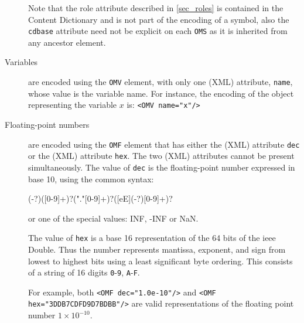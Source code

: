 \documentclass{report}
\def\XML{XML\xspace}
\def\acronym#1{\textsf{#1}}
\begin{document}
\begin{description}
Note that the role attribute described in \ref{sec_roles} is contained in the Content Dictionary and is not
part of the encoding of a symbol, also the \lstinline|cdbase| attribute need not
be explicit on each \lstinline|OMS| as it is inherited
from any ancestor element.
\item[Variables] are encoded using the \lstinline|OMV| element, with only one
  (\XML) attribute, \lstinline|name|, whose value is the variable name. For instance, the
  encoding of the object representing the variable $x$ is: \lstinline|<OMV name="x"/>|
\item[Floating-point numbers] are encoded using the \lstinline|OMF| element
  that has either the (\XML) attribute \lstinline|dec| or the (\XML) attribute
  \lstinline|hex|. The two (\XML) attributes cannot be present simultaneously. The value
  of \lstinline|dec| is the floating-point number expressed in base 10, using the common
  syntax:

\begin{lstinline}
(-?)([0-9]+)?("."[0-9]+)?([eE](-?)[0-9]+)?
\end{lstinline}

or one of the special values: INF, -INF or NaN.

The value of \lstinline|hex| is a base 16 representation of the 64 bits of the
\acronym{ieee} Double.  Thus the number represents mantissa, exponent, and sign from
lowest to highest bits using a least significant byte ordering.  This consists of a string
of 16 digits \lstinline|0|-\lstinline|9|, \lstinline|A|-\lstinline|F|.
  

For example, both \lstinline|<OMF dec="1.0e-10"/>| and 
   \lstinline|<OMF hex="3DDB7CDFD9D7BDBB"/>|
  are valid representations of the floating point number $1\times 10^{-10}$.


\end{description}
\end{document}
